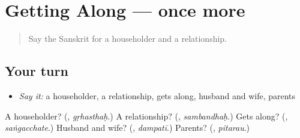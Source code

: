 \section[(dialogue)]{Getting Along — once more}

\label{lesson:SA-R501-review-final-501}



\begin{quote}
Say the Sanskrit for a householder and a relationship.
\end{quote}

\subsection*{Your turn}
\begin{itemize}
\raggedright
  \item \emph{Say it:} a householder, a relationship, gets along, husband and wife, parents
\end{itemize}

\begin{tcolorbox}[breakable,colback=teal!4,colframe=teal!35!black,title={Before you move on}]
A householder? (\textbf{}, \emph{gṛhasthaḥ}.) A relationship? (\textbf{}, \emph{sambandhaḥ}.) Gets along? (\textbf{}, \emph{saṅgacchate}.) Husband and wife? (\textbf{}, \emph{dampatī}.) Parents? (\textbf{}, \emph{pitarau}.)
\end{tcolorbox}
